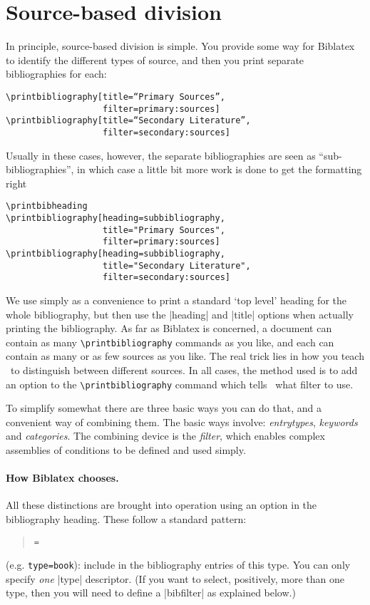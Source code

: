 \section{Source-based division}

In principle, source-based division is simple. You provide some way for
Biblatex to identify the different types of source, and then you print
separate bibliographies for each:

\begin{Verbatim}
\printbibliography[title=“Primary Sources”,
                   filter=primary:sources]
\printbibliography[title=“Secondary Literature”,
                   filter=secondary:sources]
\end{Verbatim}
Usually in these cases, however, the separate bibliographies are seen
as ``sub-bibliographies'', in which case a little bit more work is
done to get the formatting right

\begin{Verbatim}
\printbibheading
\printbibliography[heading=subbibliography,
                   title="Primary Sources",
                   filter=primary:sources]
\printbibliography[heading=subbibliography,
                   title="Secondary Literature",
                   filter=secondary:sources]
\end{Verbatim}
We use  simply as a convenience to print a
standard `top level' heading for the whole bibliography, but then use
the |heading| and |title| options when actually printing the
bibliography. As far as Biblatex is concerned, a document can contain
as many \texttt{\textbackslash{}printbibliography} commands as you
like, and each can contain as many or as few sources as you like.  The
real trick lies in how you teach \biblatex\ to distinguish between
different sources. In all cases, the method used is to add an option
to the \texttt{\textbackslash{}printbibliography} command which tells
\biblatex\ what filter to use.

To simplify somewhat there are three basic ways you can do that, and a
convenient way of combining them. The basic ways involve:
\emph{entrytypes}, \emph{keywords} and \emph{categories}. The
combining device is the \emph{filter}, which enables complex
assemblies of conditions to be defined and used simply.

\paragraph{How Biblatex chooses.} All these distinctions are brought
into operation using an option in the bibliography heading. These
follow a standard pattern:
\begin{quote}
 \texttt{=} 
\end{quote}
(e.g. \texttt{type=book}): include in the bibliography entries of this
type. You can only specify \emph{one} |type| descriptor. (If you want
to select, positively, more than one type, then you will need to
define a |bibfilter| as explained below.)

